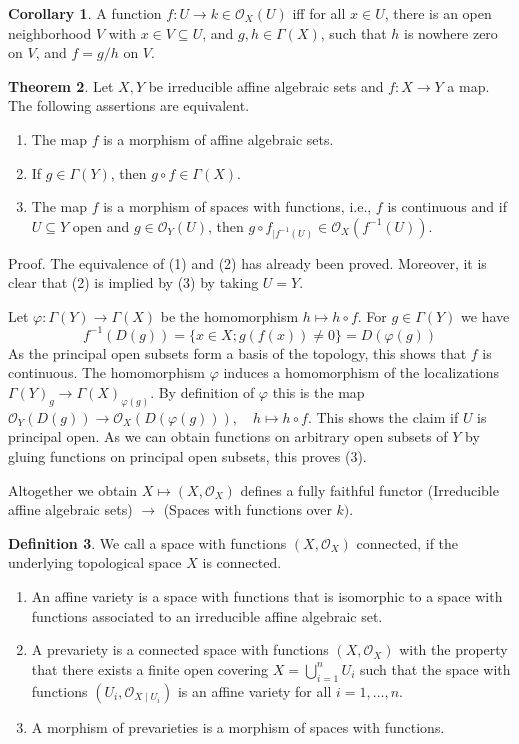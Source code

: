 \documentclass[12pt,a4paper]{book}
\newenvironment{enu}{\begin{enumerate}[(1)]}{\end{enumerate}}
\theoremstyle{definition}
\newtheorem{defn}{Definition}[section]
\newtheorem{coro}[defn]{Corollary}
\newtheorem{theo}[defn]{Theorem}
\begin{document}
\begin{coro}
    A function $f: U \rightarrow k\in \mathscr{O}_X(U)$ iff for all $x\in U$, there is an open neighborhood $V$ with $x \in V \subseteq U$, and $g, h \in \Gamma(X)$, such that 
    $h$ is nowhere zero on $V$, and $f=g / h$ on $V$.
    \label{Corollary:regular function,space with functions}
\end{coro}
\begin{theo}
    Let $X, Y$ be irreducible affine algebraic sets and $f: X \rightarrow Y$ a map. The following assertions are equivalent.
\begin{enu}   
    \item The map $f$ is a morphism of affine algebraic sets.
    \item If $g \in \Gamma(Y)$, then $g \circ f \in \Gamma(X)$.
    \item The map $f$ is a morphism of spaces with functions, i.e., $f$ is continuous and if $U \subseteq Y$ open and $g \in \mathscr{O}_Y(U)$, then $g \circ f_{\mid f^{-1}(U)} \in \mathscr{O}_X\left(f^{-1}(U)\right)$.
\end{enu}
    Proof. The equivalence of (1) and (2) has already been proved. 
    Moreover, it is clear that (2) is implied by (3) by 
    taking $U=Y$. 
    
Let $\varphi: \Gamma(Y) \rightarrow \Gamma(X)$ be the homomorphism $h \mapsto h \circ f$. For $g \in \Gamma(Y)$ we have
    $$
    f^{-1}(D(g))=\{x \in X ; g(f(x)) \neq 0\}=D(\varphi(g))
    $$
    As the principal open subsets form a basis of the topology, this shows that $f$ is continuous. The homomorphism $\varphi$ induces a homomorphism of the localizations $\Gamma(Y)_g \rightarrow \Gamma(X)_{\varphi(g)}$. 
    By definition of $\varphi$ this is the map $\mathscr{O}_Y(D(g)) \rightarrow \mathscr{O}_X(D(\varphi(g))), \quad h \mapsto h \circ f$. This shows the claim if $U$ is principal open. As we can obtain functions on arbitrary open subsets of $Y$ by gluing functions on principal open subsets, this proves (3).

\end{theo}
Altogether we obtain
$X \mapsto\left(X, \mathscr{O}_X\right)$
 defines a fully faithful functor (Irreducible affine algebraic sets) $\rightarrow$ (Spaces with functions over $k)$.
\begin{defn}
    We call a space with functions $\left(X, \mathscr{O}_X\right)$ connected, if the underlying topological space $X$ is connected.
\begin{enu} 
    \item An affine variety is a space with functions that is isomorphic to a space with functions associated to an irreducible affine algebraic set.
    \item A prevariety is a connected space with functions $\left(X, \mathscr{O}_X\right)$ with the property that there exists a finite open covering $X=\bigcup_{i=1}^n U_i$ such that the space with functions $\left(U_i, \mathscr{O}_{X \mid U_i}\right)$ is an affine variety for all $i=1, \ldots, n$.
    \item A morphism of prevarieties is a morphism of spaces with functions.
\end{enu}
\end{defn}
\end{document}
